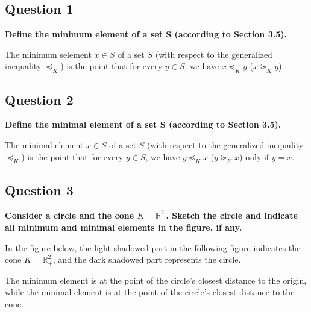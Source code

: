 
\subsection*{Question 1}
\textbf{Define the minimum element of a set S (according to Section 3.5).}

The minimum selement $x\in S$ of a set $S$ (with respect to the generalized inequality $\preccurlyeq_K$) is the point that for every $y\in S$, we have $x \preccurlyeq_K y$ ($x \succcurlyeq_K y$). 

\subsection*{Question 2}
\textbf{Deﬁne the minimal element of a set S (according to Section 3.5).}

The minimal element $x \in S$ of a set $S$ (with respect to the generalized inequality $\preccurlyeq_K$) is the point that for every $y\in S$, we have $y \preccurlyeq_K x$ ($y \succcurlyeq_K x$) only if $y = x$.

\subsection*{Question 3}
\textbf{Consider a circle and the cone $K = \mathbb{R}^2_+$. Sketch the circle and indicate all minimum and minimal elements in the ﬁgure, if any.}

In the figure below, the light shadowed part in the following figure indicates the cone $K = \mathbb{R}^2_+$, and the dark shadowed part represents the circle. 

The minimum element is at the point of the circle's closest distance to the origin, while the minimal element is at the point of the circle's closest distance to the cone.

